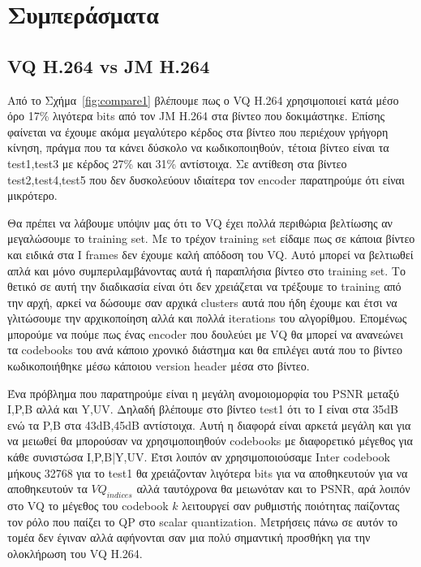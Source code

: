 ﻿\chapter{Συμπεράσματα}
\label{chapter:chap7}

\section{VQ H.264 vs JM H.264}
\label{section:sect63}

\indent Από το Σχήμα~\ref{fig:compare1} βλέπουμε πως ο VQ H.264 χρησιμοποιεί κατά μέσο όρο 17\% λιγότερα bits από τον JM H.264 στα βίντεο που δοκιμάστηκε. Επίσης φαίνεται να έχουμε ακόμα μεγαλύτερο κέρδος στα βίντεο που περιέχουν γρήγορη κίνηση, πράγμα που τα κάνει δύσκολο να κωδικοποιηθούν, τέτοια βίντεο είναι τα test1,test3 με κέρδος 27\% και 31\% αντίστοιχα. Σε αντίθεση στα βίντεο test2,test4,test5 που δεν δυσκολεύουν ιδιαίτερα τον encoder παρατηρούμε ότι είναι μικρότερο.

\indent Θα πρέπει να λάβουμε υπόψιν μας ότι το VQ έχει πολλά περιθώρια βελτίωσης αν μεγαλώσουμε το training set. Με το τρέχον training set είδαμε πως σε κάποια βίντεο και ειδικά στα I frames δεν έχουμε καλή απόδοση του VQ. Αυτό μπορεί να βελτιωθεί απλά και μόνο συμπεριλαμβάνοντας αυτά ή παραπλήσια βίντεο στο training set. Το θετικό σε αυτή την διαδικασία είναι ότι δεν χρειάζεται να τρέξουμε το training από την αρχή, αρκεί να δώσουμε σαν αρχικά clusters αυτά που ήδη έχουμε και έτσι να γλιτώσουμε την αρχικοποίηση αλλά και πολλά iterations του αλγορίθμου. Επομένως μπορούμε να πούμε πως ένας encoder που δουλεύει με VQ θα μπορεί να ανανεώνει τα codebooks του ανά κάποιο χρονικό διάστημα και θα επιλέγει αυτά που το βίντεο κωδικοποιήθηκε μέσω κάποιου version header μέσα στο βίντεο.

\indent Ένα πρόβλημα που παρατηρούμε είναι η μεγάλη ανομοιομορφία του PSNR μεταξύ I,P,B αλλά και Y,UV. Δηλαδή βλέπουμε στο βίντεο test1 ότι το I είναι στα 35dB ενώ τα P,B στα 43dB,45dB αντίστοιχα. Αυτή η διαφορά είναι αρκετά μεγάλη και για να μειωθεί θα μπορούσαν να χρησιμοποιηθούν codebooks με διαφορετικό μέγεθος για κάθε συνιστώσα I,P,B|Y,UV. Έτσι λοιπόν αν χρησιμοποιούσαμε Inter codebook μήκους 32768 για το test1 θα χρειάζονταν λιγότερα bits για να αποθηκευτούν για να αποθηκευτούν τα $VQ_{indices}$ αλλά ταυτόχρονα θα μειωνόταν και το PSNR, αρά λοιπόν στο VQ το μέγεθος του codebook $k$ λειτουργεί σαν ρυθμιστής ποιότητας παίζοντας τον ρόλο που παίζει το QP στο scalar quantization. Μετρήσεις πάνω σε αυτόν το τομέα δεν έγιναν αλλά αφήνονται σαν μια πολύ σημαντική προσθήκη για την ολοκλήρωση του VQ H.264.

